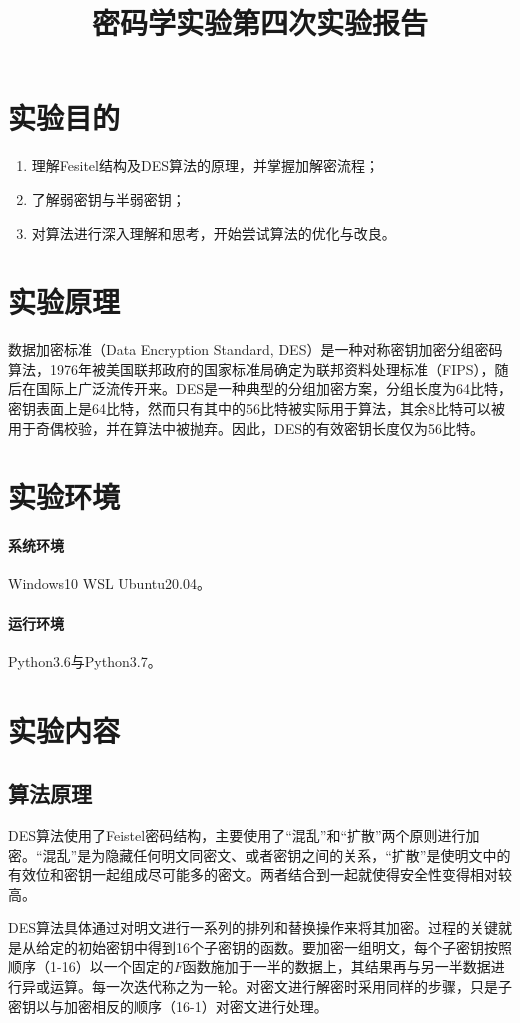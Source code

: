 \documentclass[a4paper, zihao=-4, UTF-8]{ctexart}
\title{\textbf{密码学实验第四次实验报告} }
\date{}
\begin{document}
\maketitle
\tableofcontents
\newpage
    \section{实验目的}
        \begin{enumerate}[1.]
            \item 理解Fesitel结构及DES算法的原理，并掌握加解密流程；
            \item 了解弱密钥与半弱密钥；
            \item 对算法进行深入理解和思考，开始尝试算法的优化与改良。
        \end{enumerate}
    \section{实验原理}
        数据加密标准（Data Encryption Standard, DES）是一种对称密钥加密分组密码算法，1976年被美国联邦政府的国家标准局确定为联邦资料处理标准（FIPS），随后在国际上广泛流传开来。DES是一种典型的分组加密方案，分组长度为64比特，密钥表面上是64比特，然而只有其中的56比特被实际用于算法，其余8比特可以被用于奇偶校验，并在算法中被抛弃。因此，DES的有效密钥长度仅为56比特。
    \section{实验环境}
        \paragraph*{系统环境} Windows10 WSL Ubuntu20.04。
        \paragraph*{运行环境} Python3.6与Python3.7。
    \section{实验内容}
        \subsection{算法原理}
            DES算法使用了Feistel密码结构，主要使用了“混乱”和“扩散”两个原则进行加密。“混乱”是为隐藏任何明文同密文、或者密钥之间的关系，“扩散”是使明文中的有效位和密钥一起组成尽可能多的密文。两者结合到一起就使得安全性变得相对较高。
            \par DES算法具体通过对明文进行一系列的排列和替换操作来将其加密。过程的关键就是从给定的初始密钥中得到16个子密钥的函数。要加密一组明文，每个子密钥按照顺序（1-16）以一个固定的$F$函数施加于一半的数据上，其结果再与另一半数据进行异或运算。每一次迭代称之为一轮。对密文进行解密时采用同样的步骤，只是子密钥以与加密相反的顺序（16-1）对密文进行处理。
\end{document}
